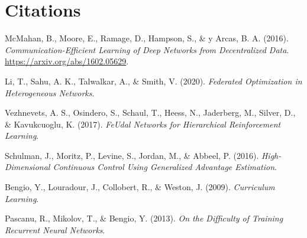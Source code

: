 \documentclass{article}
\begin{document}
\section{Citations}
\begin{thebibliography}{9}
    
McMahan, B., Moore, E., Ramage, D., Hampson, S., \& y Arcas, B. A. (2016). 
\textit{Communication-Efficient Learning of Deep Networks from Decentralized Data}. 
\url{https://arxiv.org/abs/1602.05629}.

Li, T., Sahu, A. K., Talwalkar, A., \& Smith, V. (2020). 
\textit{Federated Optimization in Heterogeneous Networks}.

Vezhnevets, A. S., Osindero, S., Schaul, T., Heess, N., Jaderberg, M., Silver, D., \& Kavukcuoglu, K. (2017). 
\textit{FeUdal Networks for Hierarchical Reinforcement Learning}.

Schulman, J., Moritz, P., Levine, S., Jordan, M., \& Abbeel, P. (2016). 
\textit{High-Dimensional Continuous Control Using Generalized Advantage Estimation}.

Bengio, Y., Louradour, J., Collobert, R., \& Weston, J. (2009). 
\textit{Curriculum Learning}.

Pascanu, R., Mikolov, T., \& Bengio, Y. (2013). 
\textit{On the Difficulty of Training Recurrent Neural Networks}.

\end{thebibliography}
\end{document}
